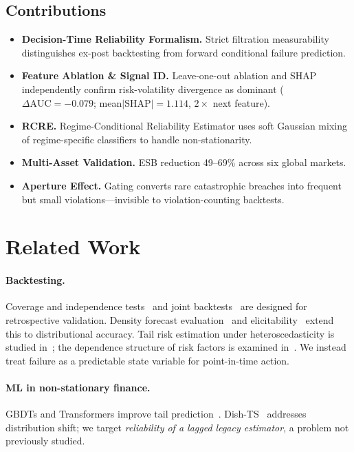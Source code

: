 \documentclass[sigconf]{acmart}
\begin{document}
\subsection{Contributions}
\begin{itemize}[leftmargin=*,itemsep=1pt,topsep=2pt]
  \item \textbf{Decision-Time Reliability Formalism.} Strict filtration
    measurability distinguishes ex-post backtesting from forward
    conditional failure prediction.
  \item \textbf{Feature Ablation \& Signal ID.} Leave-one-out ablation
    and SHAP independently confirm risk-volatility divergence as dominant
    ($\Delta\text{AUC}{=}{-}0.079$; mean$|\text{SHAP}|{=}1.114$,
    $2\times$ next feature).
  \item \textbf{RCRE.} Regime-Conditional Reliability Estimator uses
    soft Gaussian mixing of regime-specific classifiers to handle
    non-stationarity.
  \item \textbf{Multi-Asset Validation.} ESB reduction 49--69\% across
    six global markets.
  \item \textbf{Aperture Effect.} Gating converts rare catastrophic
    breaches into frequent but small violations---invisible to
    violation-counting backtests.
\end{itemize}

\section{Related Work}

\paragraph{Backtesting.}
Coverage and independence tests~\cite{kupiec1995techniques,christoffersen1998evaluating} 
and joint backtests~\cite{gaglianone2022evaluating} are designed for retrospective 
validation. Density forecast evaluation~\cite{diebold1998evaluating} and 
elicitability~\cite{nolde2017elicitability} extend this to distributional accuracy. 
Tail risk estimation under heteroscedasticity is studied in~\cite{mcneil2000estimation}; 
the dependence structure of risk factors is examined in~\cite{embrechts2002correlation}. 
We instead treat failure as a predictable state variable for point-in-time action.

\paragraph{ML in non-stationary finance.}
GBDTs and Transformers improve tail prediction~\cite{arimond2020deep,
zeng2023transformers}. Dish-TS~\cite{fan2023dishts} addresses
distribution shift; we target \emph{reliability of a lagged legacy
estimator}, a problem not previously studied.
\end{document}
